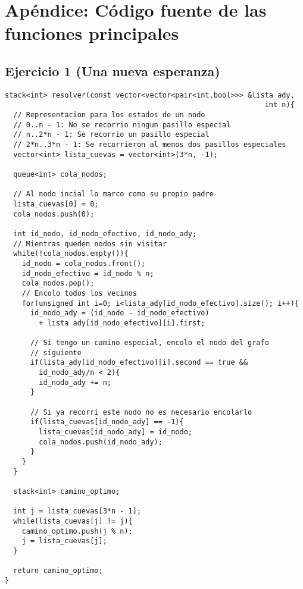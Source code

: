 \section{Apéndice: Código fuente de las funciones principales}\label{sec:codigo}

\subsection{Ejercicio 1 (Una nueva esperanza)}
\begin{lstlisting}
stack<int> resolver(const vector<vector<pair<int,bool>>> &lista_ady,
                                                             int n){
  // Representacion para los estados de un nodo
  // 0..n - 1: No se recorrio ningun pasillo especial
  // n..2*n - 1: Se recorrio un pasillo especial
  // 2*n..3*n - 1: Se recorrieron al menos dos pasillos especiales
  vector<int> lista_cuevas = vector<int>(3*n, -1);

  queue<int> cola_nodos;

  // Al nodo incial lo marco como su propio padre
  lista_cuevas[0] = 0;
  cola_nodos.push(0);

  int id_nodo, id_nodo_efectivo, id_nodo_ady;
  // Mientras queden nodos sin visitar
  while(!cola_nodos.empty()){
    id_nodo = cola_nodos.front();
    id_nodo_efectivo = id_nodo % n;
    cola_nodos.pop();
    // Encolo todos los vecinos
    for(unsigned int i=0; i<lista_ady[id_nodo_efectivo].size(); i++){
      id_nodo_ady = (id_nodo - id_nodo_efectivo) 
        + lista_ady[id_nodo_efectivo][i].first;

      // Si tengo un camino especial, encolo el nodo del grafo 
      // siguiente
      if(lista_ady[id_nodo_efectivo][i].second == true && 
        id_nodo_ady/n < 2){
        id_nodo_ady += n;
      }

      // Si ya recorri este nodo no es necesario encolarlo
      if(lista_cuevas[id_nodo_ady] == -1){
        lista_cuevas[id_nodo_ady] = id_nodo;
        cola_nodos.push(id_nodo_ady);
      }
    }
  }

  stack<int> camino_optimo;

  int j = lista_cuevas[3*n - 1];
  while(lista_cuevas[j] != j){
    camino_optimo.push(j % n);
    j = lista_cuevas[j];
  }

  return camino_optimo;
}
\end{lstlisting}

